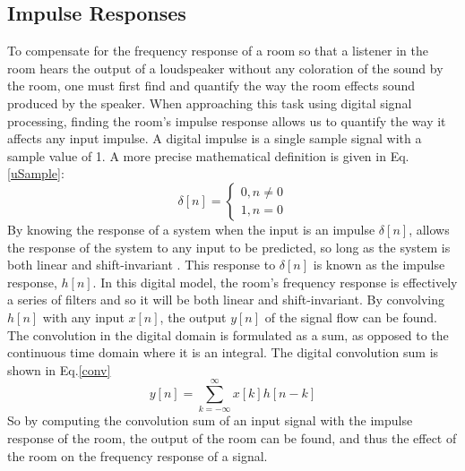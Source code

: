 \documentclass[conference]{IEEEtran}
\begin{document}
    \subsection{Impulse Responses}
        To compensate for the frequency response of a room so that a listener in the room hears the output of a loudspeaker without any coloration of the sound by the room, one must first find and quantify the way the room effects sound produced by the speaker.
        When approaching this task using digital signal processing, finding the room's impulse response allows us to quantify the way it affects any input impulse.
        A digital impulse is a single sample signal with a sample value of 1.
        A more precise mathematical definition is given in Eq.\ref{uSample}:
        \begin{equation}\label{uSample}
            \delta[n] = 
            \begin{cases}
                0, n \neq 0\\
                1, n = 0
            \end{cases}
        \end{equation}
        By knowing the response of a system when the input is an impulse $\delta[n]$, allows the response of the system to any input to be predicted, so long as the system is both linear and shift-invariant \cite{OPPENHEIM}.
        This response to $\delta[n]$ is known as the impulse response, $h[n]$.
        In this digital model, the room's frequency response is effectively a series of filters and so it will be both linear and shift-invariant.
        By convolving $h[n]$ with any input $x[n]$, the output $y[n]$ of the signal flow can be found. 
        The convolution in the digital domain is formulated as a sum, as opposed to the continuous time domain where it is an integral.
        The digital convolution sum is shown in Eq.\ref{conv}
        \begin{equation}\label{conv}
            y[n] = \sum_{k=-\infty}^\infty x[k] h[n-k]
        \end{equation}
        So by computing the convolution sum of an input signal with the impulse response of the room, the output of the room can be found, and thus the effect of the room on the frequency response of a signal.
\end{document}
